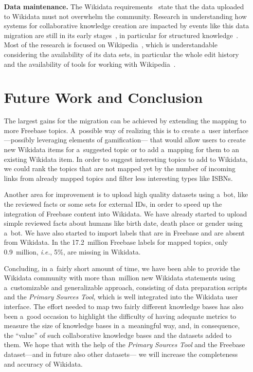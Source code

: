 \documentclass{sig-alternate-2013}
\begin{document}
\textbf{Data maintenance.}
The Wikidata requirements~\cite{wikidatareqs} state that the data uploaded to Wikidata
must not overwhelm the community.
Research in understanding how systems for collaborative knowledge creation are impacted
by events like this data migration are still in its early stages~\cite{moskaliuk2012collaborative},
in particular for structured knowledge~\cite{horridge2014webprotege}.
Most of the research is focused on Wikipedia~\cite{flock2015towards},
which is understandable considering the availability of its data sets,
in particular the whole edit history~\cite{schindler2011introducing}
and the availability of tools for working with Wikipedia~\cite{milne2013open}.


\section{Future Work and Conclusion}\label{sec:future-work-and-conclusion}

The largest gains for the migration can be achieved
by extending the mapping to more Freebase topics.
A~possible way of realizing this is to create a~user interface%
---possibly leveraging elements of gamification---%
that would allow users to create new Wikidata items for a~suggested topic
or to add a~mapping for them to an existing Wikidata item.
In order to suggest interesting topics to add to Wikidata,
we could rank the topics that are not mapped yet by the number of incoming links
from already mapped topics and filter less interesting types like ISBNs.

Another area for improvement is to upload high quality datasets using a~bot,
like the reviewed facts or some sets for external IDs,
in order to speed up the integration of Freebase content into Wikidata.
We have already started to upload simple reviewed facts about humans
like birth date, death place or gender using a~bot.
We have also started to import labels that are in Freebase and are absent from Wikidata.
In the 17.2~million Freebase labels for mapped topics,
only 0.9~million, \emph{i.e.}, 5\%, are missing in Wikidata.

Concluding, in a~fairly short amount of time, we have been able
to provide the Wikidata community with more than~million new Wikidata statements
using a~customizable and generalizable approach, consisting of data preparation scripts
and the \emph{Primary Sources Tool},
which is well integrated into the Wikidata user interface.
The effort needed to map two fairly different knowledge bases has also been a~good occasion
to highlight the difficulty of having adequate metrics to measure the size of knowledge bases
in a~meaningful way,
and, in consequence, the ``value'' of such collaborative knowledge bases and the datasets added to them.
We hope that with the help of the \emph{Primary Sources Tool} and
the Freebase dataset---and in future also other datasets---%
we will increase the completeness and accuracy of Wikidata.




\balancecolumns
\end{document}
